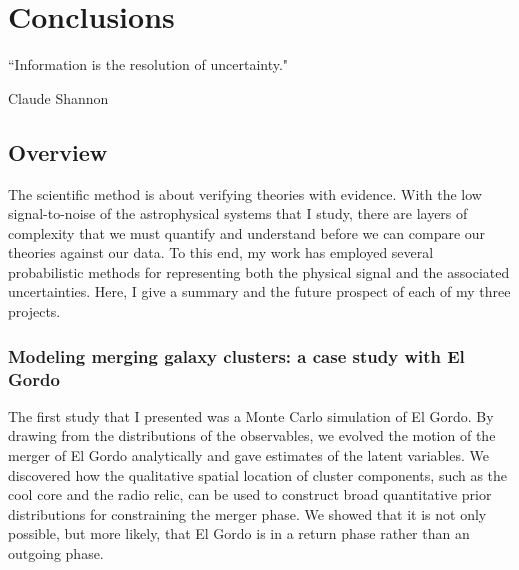 \doublespacing

\setcounter{chapter}{4}
\chapter{Conclusions}{}{}
\label{chapter5}

\epigraph{``Information is the resolution of uncertainty."}{Claude Shannon}


\section{Overview}
The scientific method is about verifying theories with evidence.
With the low signal-to-noise of the astrophysical systems that I study, 
there are layers of complexity that we must quantify and understand
before we can compare our theories against our data.
To this end, my work has employed several probabilistic  
methods for representing both the physical signal and the associated uncertainties. 
Here, I give a summary and the future prospect of each of my three projects.   


\subsection{Modeling merging galaxy clusters: a case study with El
Gordo}
The first study that I presented was a Monte Carlo simulation of El Gordo.
By drawing from the distributions of the observables,
we evolved the motion of the merger of El Gordo analytically
and gave estimates of the latent variables. 
We discovered how the qualitative spatial location 
of cluster components, such as the cool core 
and the radio relic, can be used to construct   
broad quantitative prior distributions for 
constraining the merger phase.  
We showed that it is not only possible, 
but more likely, that El Gordo is in a return phase
rather than an outgoing phase.       
 
